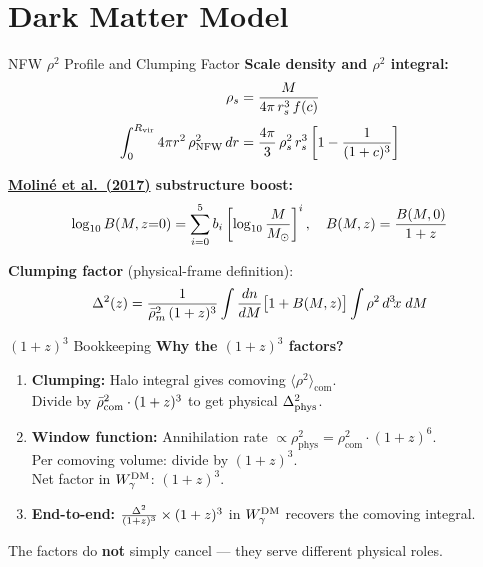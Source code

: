 \section{Dark Matter Model}

\begin{frame}{NFW $\rho^2$ Profile and Clumping Factor}
\textbf{Scale density and $\rho^2$ integral:}
\begin{align}
\rho_s &= \frac{M}{4\pi\,r_s^3\,f(c)} \\[3pt]
\int_0^{R_{\mathrm{vir}}} 4\pi r^2\,\rho_{\mathrm{NFW}}^2\,dr &= \frac{4\pi}{3}\,\rho_s^2\,r_s^3\left[1 - \frac{1}{(1+c)^3}\right]
\end{align}

\textbf{\href{https://arxiv.org/abs/1603.04057}{Moliné et al.\ (2017)} substructure boost:}
\begin{equation}
\log_{10} B(M,z{=}0) = \sum_{i=0}^5 b_i\left[\log_{10}\frac{M}{M_\odot}\right]^i, \quad B(M,z) = \frac{B(M,0)}{1+z}
\end{equation}

\textbf{Clumping factor} (physical-frame definition):
\begin{equation}
\Delta^2(z) = \frac{1}{\bar\rho_m^2\,(1+z)^3}\int \frac{dn}{dM}\bigl[1+B(M,z)\bigr]\int\rho^2\,d^3\!x\;dM
\end{equation}
\end{frame}

\begin{frame}{$(1+z)^3$ Bookkeeping}
\textbf{Why the $(1+z)^3$ factors?}

\begin{enumerate}
    \item \textbf{Clumping:} Halo integral gives comoving $\langle\rho^2\rangle_{\mathrm{com}}$.\\
    Divide by $\bar\rho_{\mathrm{com}}^2 \cdot (1+z)^3$ to get physical $\Delta^2_{\mathrm{phys}}$.

    \item \textbf{Window function:} Annihilation rate $\propto \rho_{\mathrm{phys}}^2 = \rho_{\mathrm{com}}^2\cdot(1+z)^6$.\\
    Per comoving volume: divide by $(1+z)^3$.\\
    Net factor in $W_\gamma^{\mathrm{DM}}$: $(1+z)^3$.

    \item \textbf{End-to-end:} $\frac{\Delta^2}{(1+z)^3}\times(1+z)^3$ in $W_\gamma^{\mathrm{DM}}$ recovers the comoving integral.
\end{enumerate}

\vspace{0.3cm}
The factors do \textbf{not} simply cancel --- they serve different physical roles.
\end{frame}

